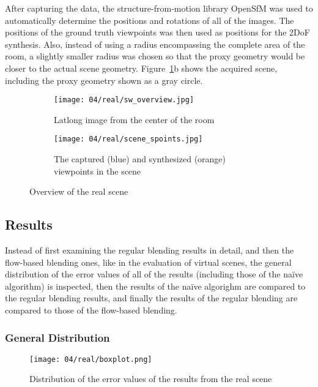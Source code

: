 After capturing the data, the structure-from-motion library OpenSfM \cite{opensfm} was used to automatically determine the positions and rotations of all of the images. The positions of the ground truth viewpoints was then used as positions for the 2DoF synthesis.
Also, instead of using a radius encompassing the complete area of the room, a slightly smaller radius was chosen so that the proxy geometry would be closer to the actual scene geometry. Figure~\ref{fig:real_setup}b shows the acquired scene, including the proxy geometry shown as a gray circle.

\begin{figure}
\centering
    \hfill
    \begin{subfigure}[c]{0.65\textwidth}
            \centering
            \texttt{[image: 04/real/sw\_overview.jpg]}
            \caption{Latlong image from the center of the room}
    \end{subfigure}
    \hfill
    \begin{subfigure}[c]{0.33\textwidth}
            \centering
            \texttt{[image: 04/real/scene\_spoints.jpg]}
            \caption{The captured (blue) and synthesized (orange) viewpoints in the scene}
    \end{subfigure}
    \hfill
  \caption{Overview of the real scene}
  \label{fig:real_setup}
\end{figure}


\subsection{Results}

Instead of first examining the regular blending results in detail, and then the flow-based blending ones, like in the evaluation of virtual scenes, the general distribution of the error values of all of the results (including those of the na\"ive algorithm) is inspected, then the results of the na\"ive algorighm are compared to the regular blending results, and finally the results of the regular blending are compared to those of the flow-based blending.

\subsubsection{General Distribution}
\begin{figure}
		\centering
		\texttt{[image: 04/real/boxplot.png]}
		\caption{Distribution of the error values of the results from the real scene}
		\label{fig:real_boxplot}
\end{figure}

